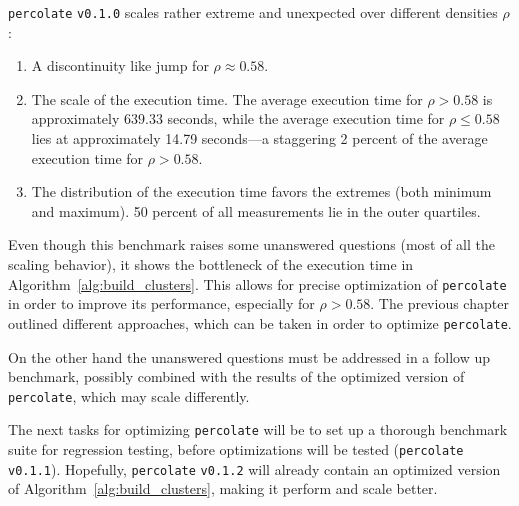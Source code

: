 \documentclass[twoside,11pt]{article}
\def\perc{\texttt{perco\-late}}
\def\v{\texttt{v0.1.0}}
\begin{document}
\perc{} \v{} scales rather extreme and unexpected over
different densities $\rho$:

\begin{enumerate}
  \item A discontinuity like jump for $\rho \approx 0.58$.

  \item The scale of the execution time.
        The average execution time for $\rho > 0.58$ is
        approximately $639.33$ seconds, while the average
        execution time for $\rho \leq 0.58$ lies at
        approximately 14.79 seconds---a staggering 2
        percent of the average execution time for
        $\rho > 0.58$.

  \item The distribution of the execution time favors
        the extremes (both minimum and maximum). 50 percent
        of all measurements lie in the outer quartiles.
\end{enumerate}

Even though this benchmark raises some unanswered
questions (most of all the scaling behavior), it shows the
bottleneck of the execution time in
Algorithm~\ref{alg:build_clusters}.
This allows for precise optimization of \perc{} in order to
improve its performance, especially for $\rho > 0.58$.
The previous chapter outlined different approaches, which
can be taken in order to optimize \perc{}.

On the other hand the unanswered questions must be
addressed in a follow up benchmark, possibly combined with
the results of the optimized version of \perc{}, which may
scale differently.

The next tasks for optimizing \perc{} will be to set up
a thorough benchmark suite for regression testing, before
optimizations will be tested (\perc{} \texttt{v0.1.1}).
Hopefully, \perc{} \texttt{v0.1.2} will already contain
an optimized version of Algorithm~\ref{alg:build_clusters},
making it perform and scale better.



\end{document}
